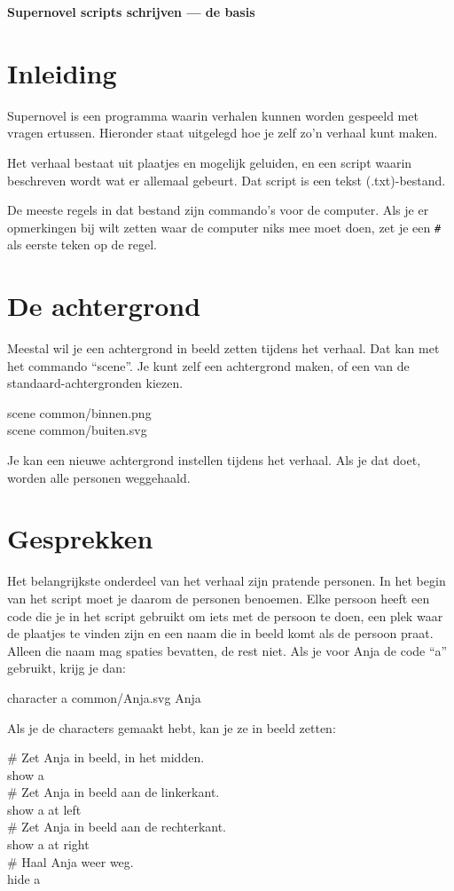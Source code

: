 \documentclass{article}
\newcommand\code[1]{\par\noindent\begin{texttt}#1\end{texttt}\par}
\begin{document}
\noindent\textbf{\Large Supernovel scripts schrijven --- de basis}

\tableofcontents

\section{Inleiding}
Supernovel is een programma waarin verhalen kunnen worden gespeeld met vragen
ertussen. Hieronder staat uitgelegd hoe je zelf zo'n verhaal kunt maken.

Het verhaal bestaat uit plaatjes en mogelijk geluiden, en een script waarin
beschreven wordt wat er allemaal gebeurt. Dat script is een tekst
(.txt)-bestand.

De meeste regels in dat bestand zijn commando's voor de computer. Als je er
opmerkingen bij wilt zetten waar de computer niks mee moet doen, zet je een
\verb-#- als eerste teken op de regel.

\section{De achtergrond}
Meestal wil je een achtergrond in beeld zetten tijdens het verhaal. Dat kan met
het commando ``scene''. Je kunt zelf een achtergrond maken, of een van de
standaard-achtergronden kiezen.
\code{scene common/binnen.png\\
scene common/buiten.svg}

Je kan een nieuwe achtergrond instellen tijdens het verhaal. Als je dat doet,
worden alle personen weggehaald.

\section{Gesprekken}
Het belangrijkste onderdeel van het verhaal zijn pratende personen. In het
begin van het script moet je daarom de personen benoemen. Elke persoon heeft
een code die je in het script gebruikt om iets met de persoon te doen, een plek
waar de plaatjes te vinden zijn en een naam die in beeld komt als de persoon
praat. Alleen die naam mag spaties bevatten, de rest niet. Als je voor Anja de
code ``a'' gebruikt, krijg je dan:
\code{character a common/Anja.svg Anja}

\noindent Als je de characters gemaakt hebt, kan je ze in beeld zetten:
\code{\# Zet Anja in beeld, in het midden.\\
show a\\
\# Zet Anja in beeld aan de linkerkant.\\
show a at left\\
\# Zet Anja in beeld aan de rechterkant.\\
show a at right\\
\# Haal Anja weer weg.\\
hide a}
\end{document}
